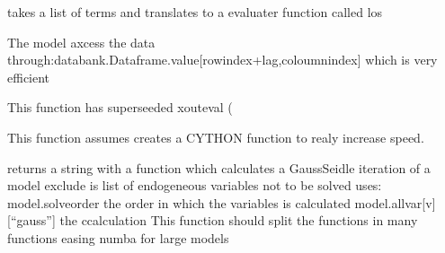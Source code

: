 \documentclass[letterpaper,10pt,english]{sphinxmanual}
\begin{document}
\begin{fulllineitems}

\begin{fulllineitems}
\label{\detokenize{unsorted/modelclass2:modelclass2.simmodel.cytouteval}}
\pysigstartsignatures
{}
\pysigstopsignatures
\sphinxAtStartPar
takes a list of terms and translates to a evaluater function called los

\sphinxAtStartPar
The model axcess the data through:databank.Dataframe.value{[}rowindex+lag,coloumnindex{]} which is very efficient

\sphinxAtStartPar
This function has superseeded xouteval (

\sphinxAtStartPar
This function assumes creates a CYTHON function to realy increase speed.

\end{fulllineitems}


\begin{fulllineitems}
\label{\detokenize{unsorted/modelclass2:modelclass2.simmodel.teststuff3}}
\pysigstartsignatures
{}
\pysigstopsignatures
\end{fulllineitems}


\begin{fulllineitems}
\label{\detokenize{unsorted/modelclass2:modelclass2.simmodel.outsolve2}}
\pysigstartsignatures
{}
\pysigstopsignatures
\sphinxAtStartPar
returns a string with a function which calculates a
Gauss\sphinxhyphen{}Seidle iteration of a model
exclude is list of endogeneous variables not to be solved
uses:
model.solveorder the order in which the variables is calculated
model.allvar{[}v{]}{[}“gauss”{]} the ccalculation
This function should split the functions in many functions easing numba for large models


\end{fulllineitems}
\end{fulllineitems}
\end{document}
